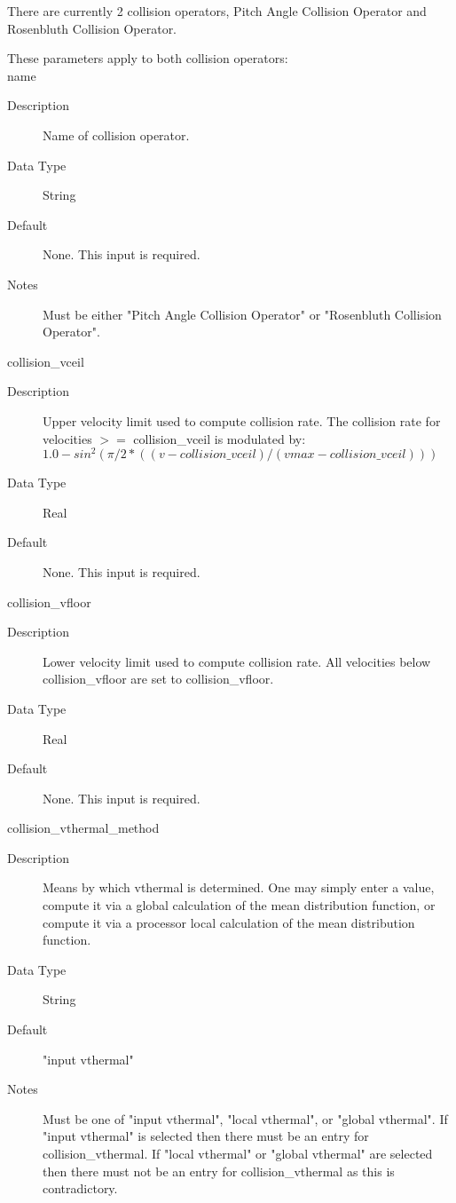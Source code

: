 \documentclass[11pt]{amsart}
\begin{document}
There are currently 2 collision operators, Pitch Angle Collision Operator and
Rosenbluth Collision Operator.

These parameters apply to both collision operators: \\
\indent name
\begin{description}
\item [Description] Name of collision operator.
\item [Data Type] String
\item [Default] None.  This input is required.
\item [Notes] Must be either "Pitch Angle Collision Operator" or "Rosenbluth
Collision Operator".
\end{description}

collision\_vceil
\begin{description}
\item [Description] Upper velocity limit used to compute collision rate.  The
collision rate for velocities $>=$ collision\_vceil is modulated by: \\
\begin{math} 1.0-sin^2(\pi/2*((v-collision\_vceil)/(vmax-collision\_vceil))) \end{math}
\item [Data Type] Real
\item [Default] None.  This input is required.
\end{description}

collision\_vfloor
\begin{description}
\item [Description] Lower velocity limit used to compute collision rate.  All
velocities below collision\_vfloor are set to collision\_vfloor.
\item [Data Type] Real
\item [Default] None.  This input is required.
\end{description}

collision\_vthermal\_method
\begin{description}
\item [Description] Means by which vthermal is determined.  One may simply
enter a value, compute it via a global calculation of the mean distribution
function, or compute it via a processor local calculation of the mean
distribution function.
\item [Data Type] String
\item [Default] "input vthermal"
\item [Notes] Must be one of "input vthermal", "local vthermal", or
"global vthermal".  If "input vthermal" is selected then there must be an entry
for collision\_vthermal.  If "local vthermal" or "global vthermal" are
selected then there must not be an entry for collision\_vthermal as this is
contradictory.
\end{description}
\end{document}
